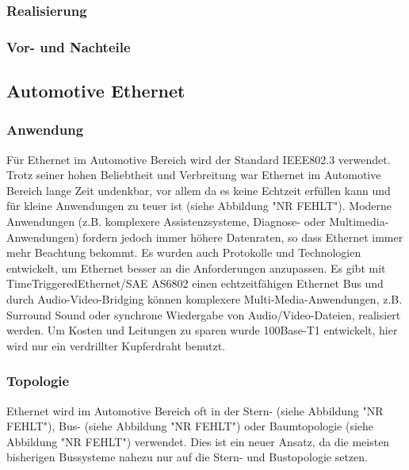 \subsubsection{Realisierung}
\subsubsection{Vor- und Nachteile}

\subsection{Automotive Ethernet}
\subsubsection{Anwendung}
Für Ethernet im Automotive Bereich wird der Standard IEEE802.3 verwendet. Trotz seiner hohen Beliebtheit und Verbreitung war Ethernet im Automotive Bereich lange Zeit undenkbar, vor allem da es keine Echtzeit erfüllen kann und für kleine Anwendungen zu teuer ist (siehe Abbildung "NR FEHLT"). Moderne Anwendungen (z.B. komplexere Assistenzsysteme, Diagnose- oder Multimedia-Anwendungen) fordern jedoch immer höhere Datenraten, so dass Ethernet immer mehr Beachtung bekommt. Es wurden auch Protokolle und Technologien entwickelt, um Ethernet besser an die Anforderungen anzupassen. Es gibt mit TimeTriggeredEthernet/SAE AS6802 einen echtzeitfähigen Ethernet Bus und durch Audio-Video-Bridging können komplexere Multi-Media-Anwendungen, z.B. Surround Sound oder synchrone Wiedergabe von Audio/Video-Dateien, realisiert werden. Um Kosten und Leitungen zu sparen wurde 100Base-T1 entwickelt, hier wird nur ein verdrillter Kupferdraht benutzt.

\cite{.MH_Ethernet}
\cite{.MH_AutoEthernet}

\subsubsection{Topologie}
Ethernet wird im Automotive Bereich oft in der Stern- (siehe Abbildung "NR FEHLT"), Bus- (siehe Abbildung "NR FEHLT") oder Baumtopologie (siehe Abbildung "NR FEHLT") verwendet. Dies ist ein neuer Ansatz, da die meisten bisherigen Bussysteme nahezu nur auf die Stern- und Bustopologie setzen.

\cite{.MH_Vehicle}

